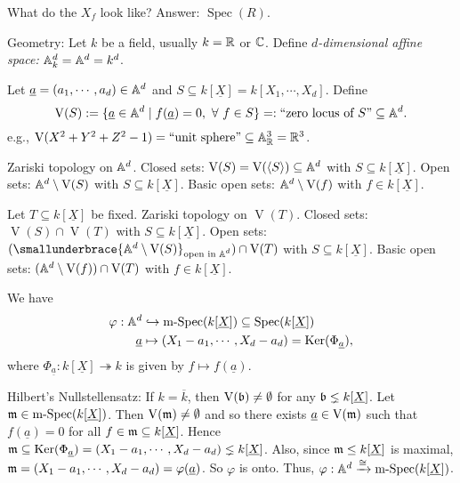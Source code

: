 \begin{question*}
    What do the $X_f$ look like? Answer: $\operatorname{Spec}(R)$.
\end{question*}

\begin{construction*}
    Geometry: Let $k$ be a field, usually $k = \mathbb{R}$ or $\mathbb{C}$. Define \emph{$d$-dimensional affine space:} $\mathbb{A}^d_k = \mathbb{A}^d = k^d$. \par 
    Let $\underline a = (a_1,\cdots,a_d) \in \mathbb{A}^d$ and $S \subseteq k[\underline X] = k[X_1,\cdots,X_d]$. Define
    \[\operatorname{V}(S) := \{\underline a \in \mathbb{A}^d \mid f(\underline a) = 0,\ \forall \  f \in S\} =: \text{``zero locus of $S$''} \subseteq \mathbb{A}^d.\] 
    e.g., $\operatorname{V}(X^2+Y^2+Z^2-1) = \text{``unit sphere''} \subseteq \mathbb{A}^3_{\mathbb{R}} = \mathbb{R}^3$. \par 
    Zariski topology on $\mathbb{A}^d$. Closed sets: $\operatorname{V}(S) = \operatorname{V}(\langle S \rangle) \subseteq \mathbb{A}^d$ with $S \subseteq k[\underline X]$. Open sets: $\mathbb{A}^d \setminus \operatorname{V}(S)$ with $S \subseteq k[\underline X]$. Basic open sets: $\mathbb{A}^d \setminus \operatorname{V}(f)$ with $f \in k[\underline X]$. \par 
    Let $T \subseteq k[\underline X]$ be fixed. Zariski topology on $\operatorname{V}(T)$. Closed sets: $\operatorname{V}(S) \cap \operatorname{V}(T)$ with $S \subseteq k[\underline X]$. Open sets: $(\smallunderbrace{\bbA^d \setminus \operatorname{V}(S)}_{\text{open in $\bbA^d$}}) \cap \operatorname{V}(T)$ with $S \subseteq k[\underline X]$.  Basic open sets: $(\mathbb{A}^d \setminus \operatorname{V}(f)) \cap \operatorname{V}(T)$ with $f \in k[\underline X]$. \par 
    We have 
    \begin{align*}
        \varphi: \mathbb{A}^d &\hookrightarrow \operatorname{m-Spec}(k[\underline X]) \subseteq \operatorname{Spec}(k[\underline X]) \\
        \underline a &\mapsto (X_1-a_1,\cdots,X_d-a_d) = \operatorname{Ker}(\Phi_{\underline a}), 
    \end{align*}
    where $\Phi_{\underline a}: k[\underline X] \twoheadrightarrow k$ is given by $f \mapsto f(\underline a)$. \par 
    Hilbert's Nullstellensatz: If $k = \overline k$, then $\operatorname{V}(\mathfrak{b}) \neq \emptyset$ for any $\mathfrak{b} \lneq k[\underline X]$. Let $\mathfrak{m} \in \operatorname{m-Spec}(k[\underline X])$. Then $\operatorname{V}(\mathfrak{m}) \neq \emptyset$ and so there exists $\underline a \in \operatorname{V}(\mathfrak{m})$ such that $f(\underline a) = 0$ for all $f \in \mathfrak{m} \subseteq k[\underline X]$. Hence $\mathfrak{m} \subseteq \operatorname{Ker}(\Phi_{\underline a}) = (X_1-a_1,\cdots,X_d-a_d) \lneq k[\underline X]$. Also, since $\mathfrak{m} \leq k[\underline X]$ is maximal, $\mathfrak{m} = (X_1-a_1,\cdots,X_d-a_d) = \varphi(\underline a)$. So $\varphi$ is onto. Thus, $\varphi: \mathbb{A}^d \xrightarrow \cong \operatorname{m-Spec}(k[\underline X])$. \par 

\end{construction*}
